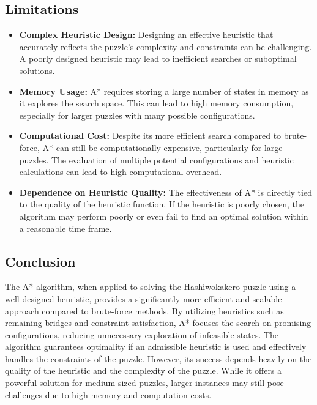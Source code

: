\subsection*{Limitations}
\begin{itemize}
    \item \textbf{Complex Heuristic Design:} Designing an effective heuristic that accurately reflects the puzzle's complexity and constraints can be challenging. A poorly designed heuristic may lead to inefficient searches or suboptimal solutions.
    \item \textbf{Memory Usage:} A* requires storing a large number of states in memory as it explores the search space. This can lead to high memory consumption, especially for larger puzzles with many possible configurations.
    \item \textbf{Computational Cost:} Despite its more efficient search compared to brute-force, A* can still be computationally expensive, particularly for large puzzles. The evaluation of multiple potential configurations and heuristic calculations can lead to high computational overhead.
    \item \textbf{Dependence on Heuristic Quality:} The effectiveness of A* is directly tied to the quality of the heuristic function. If the heuristic is poorly chosen, the algorithm may perform poorly or even fail to find an optimal solution within a reasonable time frame.
\end{itemize}

\subsection*{Conclusion}
The A* algorithm, when applied to solving the Hashiwokakero puzzle using a well-designed heuristic, provides a significantly more efficient and scalable approach compared to brute-force methods. By utilizing heuristics such as remaining bridges and constraint satisfaction, A* focuses the search on promising configurations, reducing unnecessary exploration of infeasible states. The algorithm guarantees optimality if an admissible heuristic is used and effectively handles the constraints of the puzzle. However, its success depends heavily on the quality of the heuristic and the complexity of the puzzle. While it offers a powerful solution for medium-sized puzzles, larger instances may still pose challenges due to high memory and computation costs.

